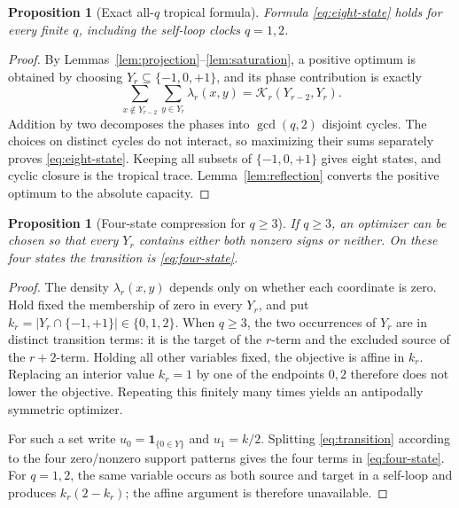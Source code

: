 \documentclass[11pt]{article}
\newtheorem{proposition}[theorem]{Proposition}
\theoremstyle{definition}
\theoremstyle{remark}
\newcommand{\ind}{\mathbf 1}
\newcommand{\T}{\{-1,0,+1\}}
\begin{document}
\begin{proposition}[Exact all-\(q\) tropical formula]
\label{prop:tropical}
Formula \eqref{eq:eight-state} holds for every finite \(q\), including the
self-loop clocks \(q=1,2\).
\end{proposition}

\begin{proof}
By Lemmas~\ref{lem:projection}--\ref{lem:saturation}, a positive optimum
is obtained by choosing \(Y_r\subseteq\T\), and its phase contribution is
exactly
\[
 \sum_{x\notin Y_{r-2}}\sum_{y\in Y_r}\lambda_r(x,y)
 =\mathcal K_r(Y_{r-2},Y_r).
\]
Addition by two decomposes the phases into \(\gcd(q,2)\) disjoint cycles.
The choices on distinct cycles do not interact, so maximizing their sums
separately proves \eqref{eq:eight-state}.  Keeping all subsets of \(\T\)
gives eight states, and cyclic closure is the tropical trace.
Lemma~\ref{lem:reflection} converts the positive optimum to the absolute
capacity.
\end{proof}

\begin{proposition}[Four-state compression for \(q\geq3\)]
\label{prop:compression}
If \(q\geq3\), an optimizer can be chosen so that every \(Y_r\) contains
either both nonzero signs or neither.  On these four states the transition
is \eqref{eq:four-state}.
\end{proposition}

\begin{proof}
The density \(\lambda_r(x,y)\) depends only on whether each coordinate is
zero.  Hold fixed the membership of zero in every \(Y_r\), and put
\(k_r=|Y_r\cap\{-1,+1\}|\in\{0,1,2\}\).  When \(q\geq3\), the two
occurrences of \(Y_r\) are in distinct transition terms: it is the target
of the \(r\)-term and the excluded source of the \(r+2\)-term.  Holding
all other variables fixed, the objective is affine in \(k_r\).  Replacing
an interior value \(k_r=1\) by one of the endpoints \(0,2\) therefore
does not lower the objective.  Repeating this finitely many times yields
an antipodally symmetric optimizer.

For such a set write \(u_0=\ind_{\{0\in Y\}}\) and
\(u_1=k/2\).  Splitting \eqref{eq:transition} according to the four
zero/nonzero support patterns gives the four terms in
\eqref{eq:four-state}.  For \(q=1,2\), the same variable occurs as both
source and target in a self-loop and produces \(k_r(2-k_r)\); the affine
argument is therefore unavailable.
\end{proof}
\end{document}
